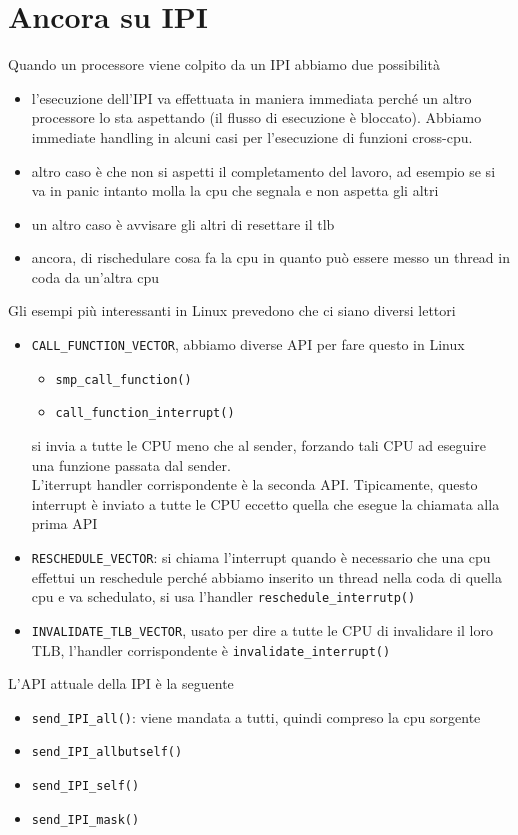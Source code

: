 \documentclass[12pt, oneside]{extbook}
\begin{document}
\section{Ancora su IPI}
Quando un processore viene colpito da un IPI abbiamo due possibilità
\begin{itemize}
\item l'esecuzione dell'IPI va effettuata in maniera immediata perché un altro processore lo sta aspettando (il flusso di esecuzione è bloccato). Abbiamo immediate handling in alcuni casi per l'esecuzione di funzioni cross-cpu.
\item altro caso è che non si aspetti il completamento del lavoro, ad esempio se si va in panic intanto molla la cpu che segnala e non aspetta gli altri
\item un altro caso è avvisare gli altri di resettare il tlb
\item ancora, di rischedulare cosa fa la cpu in quanto può essere messo un thread in coda da un'altra cpu
\end{itemize}
Gli esempi più interessanti in Linux prevedono che ci siano diversi lettori
\begin{itemize}
\item \texttt{CALL\_FUNCTION\_VECTOR}, abbiamo diverse API per fare questo in Linux
\begin{itemize}
\item \texttt{smp\_call\_function()}
\item \texttt{call\_function\_interrupt()}
\end{itemize}
si invia a tutte le CPU meno che al sender, forzando tali CPU ad eseguire una funzione passata dal sender.\\L'iterrupt handler corrispondente è la seconda API. Tipicamente, questo interrupt è inviato a tutte le CPU eccetto quella che esegue la chiamata alla prima API
\item \texttt{RESCHEDULE\_VECTOR}: si chiama l'interrupt quando è necessario che una cpu effettui un reschedule perché abbiamo inserito un thread nella coda di quella cpu e va schedulato, si usa l'handler \texttt{reschedule\_interrutp()}
\item \texttt{INVALIDATE\_TLB\_VECTOR}, usato per dire a tutte le CPU di invalidare il loro TLB, l'handler corrispondente è \texttt{invalidate\_interrupt()}
\end{itemize}
L'API attuale della IPI è la seguente
\begin{itemize}
\item \texttt{send\_IPI\_all()}: viene mandata a tutti, quindi compreso la cpu sorgente
\item \texttt{send\_IPI\_allbutself()}
\item \texttt{send\_IPI\_self()}
\item \texttt{send\_IPI\_mask()}
\end{itemize}
\end{document}
